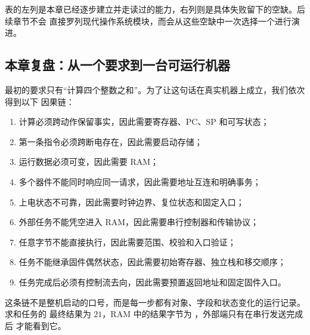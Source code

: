 表的左列是本章已经逐步建立并走读过的能力，右列则是具体失败留下的空缺。后续章节不会
直接罗列现代操作系统模块，而会从这些空缺中一次选择一个进行演进。

\subsection{本章复盘：从一个要求到一台可运行机器}

最初的要求只有“计算四个整数之和”。为了让这句话在真实机器上成立，我们依次得到以下
因果链：

\begin{enumerate}
\item 计算必须跨动作保留事实，因此需要寄存器、PC、SP 和可写状态；
\item 第一条指令必须跨断电存在，因此需要启动存储；
\item 运行数据必须可变，因此需要 RAM；
\item 多个器件不能同时响应同一请求，因此需要地址互连和明确事务；
\item 上电状态不可靠，因此需要时钟边界、复位状态和固定入口；
\item 外部任务不能凭空进入 RAM，因此需要串行控制器和传输协议；
\item 任意字节不能直接执行，因此需要范围、校验和入口验证；
\item 任务不能继承固件偶然状态，因此需要初始寄存器、独立栈和移交顺序；
\item 任务完成后必须有控制流去向，因此需要预置返回地址和固定固件入口。
\end{enumerate}

这条链不是整机启动的口号，而是每一步都有对象、字段和状态变化的运行记录。求和任务的
最终结果为 \(21\)，RAM 中的结果字节为 ，外部端只有在串行发送完成后
才能看到它。
